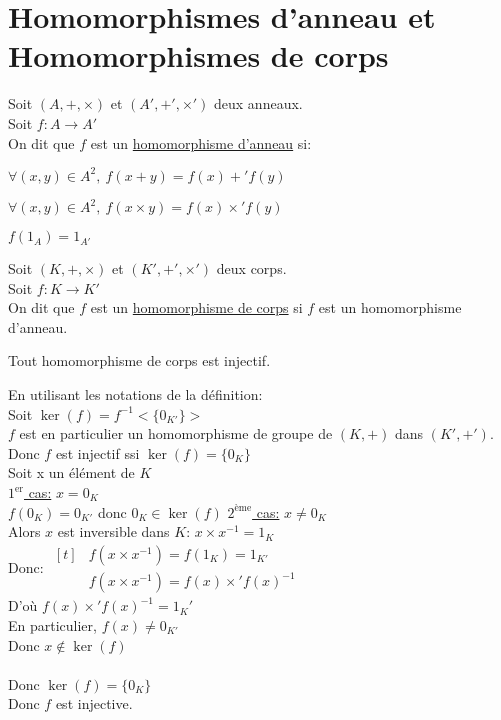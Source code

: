 \documentclass[12pt,twoside,a4paper]{article}
\begin{document}
	\section{Homomorphismes d'anneau et Homomorphismes de corps}
		\begin{defi}
			Soit $(A,+,\times)$ et $(A',+',\times')$ deux anneaux.\\
			Soit $f:A\rightarrow A'$\\
			On dit que $f$ est un \underline{homomorphisme d'anneau} si:
			\begin{liste}
				\item $\forall(x,y)\in A^2,\ f(x+y)=f(x)+'f(y)$
				\item $\forall(x,y)\in A^2,\ f(x\times y)=f(x)\times'f(y)$
				\item $f(1_A)=1_{A'}$
			\end{liste}
		\end{defi}
		\begin{defi}
				Soit $(K,+,\times)$ et $(K',+',\times')$ deux corps.\\
				Soit $f:K\rightarrow K'$\\
				On dit que $f$ est un \underline{homomorphisme de corps} si $f$ est un homomorphisme d'anneau.
		\end{defi}
		\begin{prop}
			Tout homomorphisme de corps est injectif.
		\end{prop}
		\begin{preuve}
			En utilisant les notations de la d\'efinition:\\
			Soit $\ker(f)=f^{-1}<\{0_{K'}\}>$\\
			$f$ est en particulier un homomorphisme de groupe de $(K,+)$ dans $(K',+')$. Donc $f$ est injectif ssi $\ker(f)=\{0_K\}$\\
			Soit x un \'el\'ement de $K$\\
			\underline{$1^{\text{er}}$ cas:} $x=0_K$\\
			$f(0_K)=0_{K'}$ donc $0_K\in\ker(f)$
			\underline{$2^{\text{\`eme}}$ cas:} $x\neq0_K$\\
			Alors $x$ est inversible dans $K$: $x\times x^{-1}=1_K$\\
			Donc: 
			$\begin{aligned}[t]
			& f(x\times x^{-1})=f(1_K)=1_{K'}\\
			& f(x\times x^{-1})=f(x)\times'f(x)^{-1}
			\end{aligned}$\\
			D'o\`u $f(x)\times'f(x)^{-1}=1_K'$\\
			En particulier, $f(x)\neq 0_{K'}$\\
			Donc $x\notin \ker(f)$\\
			\\
			Donc $\ker(f)=\{0_K\}$\\
			Donc $f$ est injective.
		\end{preuve}
\end{document}
